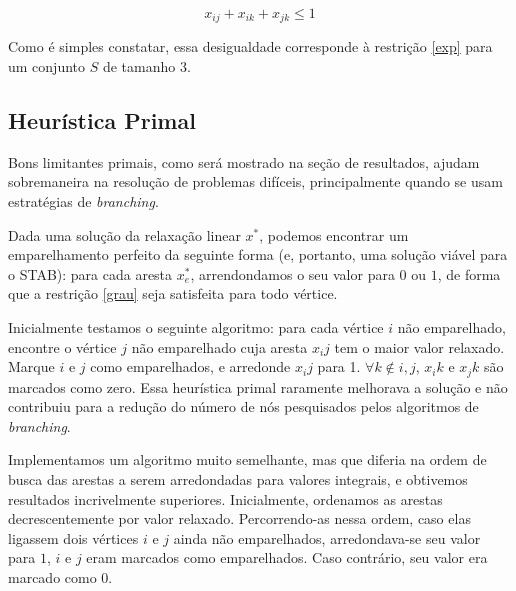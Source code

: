 \documentclass[11pt]{article}
\begin{document}
\begin{equation}
 x_{ij} + x_{ik} + x_{jk} \leq 1
\end{equation}

Como é simples constatar, essa desigualdade corresponde à restrição
\eqref{exp} para um conjunto $S$ de tamanho $3$. 

\subsection{Heurística Primal}

Bons limitantes primais, como será mostrado na seção de resultados,
ajudam sobremaneira na resolução de problemas difíceis, principalmente
quando se usam estratégias de \emph{branching}.

Dada uma solução da relaxação linear $x^*$, podemos encontrar um
emparelhamento perfeito da seguinte forma (e, portanto, uma solução
viável para o STAB): para cada aresta $x^*_e$, arrendondamos o seu valor
para $0$ ou $1$, de forma que a restrição \eqref{grau} seja satisfeita
para todo vértice. 

Inicialmente testamos o seguinte algoritmo: para cada vértice $i$ não
emparelhado, encontre o vértice $j$ não emparelhado cuja aresta $x_ij$
tem o maior valor relaxado. Marque $i$ e $j$ como emparelhados, e
arredonde $x_ij$ para 1. $\forall k \nin {i,j}$, $x_ik$ e $x_jk$ são
marcados como zero. Essa heurística primal raramente melhorava a
solução e não contribuiu para a redução do número de nós pesquisados
pelos algoritmos de \emph{branching}. 

Implementamos um algoritmo muito semelhante, mas que diferia na ordem de
busca das arestas a serem arredondadas para valores integrais, e
obtivemos resultados incrivelmente superiores. Inicialmente, ordenamos
as arestas decrescentemente por valor relaxado. Percorrendo-as nessa
ordem, caso elas ligassem dois vértices $i$ e $j$ ainda não emparelhados,
arredondava-se seu valor para $1$, $i$ e $j$ eram marcados como
emparelhados. Caso contrário, seu valor era marcado como $0$. 
\end{document}
